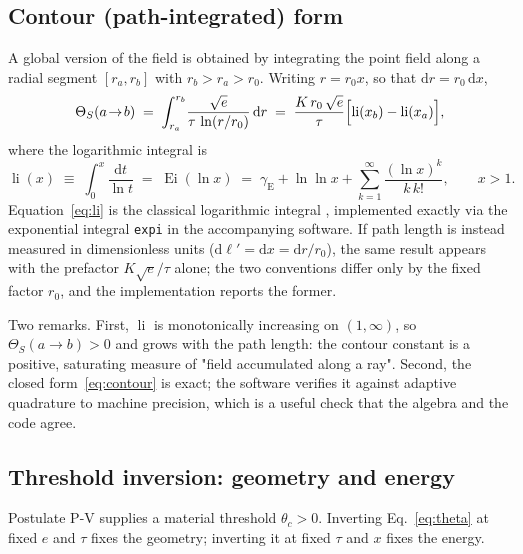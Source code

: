 \documentclass[11pt,a4paper]{article}
\newcommand{\ThetaS}{\Theta_{S}}
\newcommand{\dd}{\mathrm{d}}
\newcommand{\tgrad}{\tau}
\newcommand{\logint}{\operatorname{li}}
\newcommand{\Ei}{\operatorname{Ei}}
\newcommand{\Euler}{\gamma_{\mathrm{E}}}
\newcommand{\code}[1]{\texttt{#1}}
\begin{document}
\subsection{Contour (path-integrated) form}
\label{sec:contour}

A global version of the field is obtained by integrating the point field along
a radial segment $[r_a, r_b]$ with $r_b > r_a > r_0$. Writing
$r = r_0 x$, so that $\dd r = r_0\,\dd x$,
\begin{equation}
  \ThetaS(a\!\to\!b)
  \;=\; \int_{r_a}^{r_b}\!
  \frac{\sqrt{e}}{\tgrad\,\ln(r/r_0)}\,\dd r
  \;=\; \frac{K\,r_0\,\sqrt{e}}{\tgrad}
  \Bigl[\logint(x_b)-\logint(x_a)\Bigr],
  \label{eq:contour}
\end{equation}
where the logarithmic integral is
\begin{equation}
  \logint(x) \;\equiv\; \int_0^{x}\frac{\dd t}{\ln t}
  \;=\; \Ei(\ln x)
  \;=\; \Euler + \ln\!\ln x
     + \sum_{k=1}^{\infty}\frac{(\ln x)^{k}}{k\,k!},
  \qquad x>1 .
  \label{eq:li}
\end{equation}
Equation~\eqref{eq:li} is the classical logarithmic integral
\cite{abramowitz1964}, implemented exactly via the exponential integral
\code{expi} in the accompanying software.
If path length is instead measured in dimensionless units
($\dd\ell' = \dd x = \dd r/r_0$), the same result appears with the prefactor
$K\sqrt{e}/\tgrad$ alone; the two conventions differ only by the fixed factor
$r_0$, and the implementation reports the former.

Two remarks. First, $\logint$ is monotonically increasing on $(1,\infty)$, so
$\ThetaS(a\!\to\!b) > 0$ and grows with the path length: the contour constant
is a positive, saturating measure of "field accumulated along a ray".
Second, the closed form~\eqref{eq:contour} is exact; the software verifies it
against adaptive quadrature to machine precision, which is a useful check
that the algebra and the code agree.

\subsection{Threshold inversion: geometry and energy}
\label{sec:inversion}

Postulate P-V supplies a material threshold $\theta_c > 0$. Inverting
Eq.~\eqref{eq:theta} at fixed $e$ and $\tgrad$ fixes the geometry; inverting it
at fixed $\tgrad$ and $x$ fixes the energy.
\end{document}
